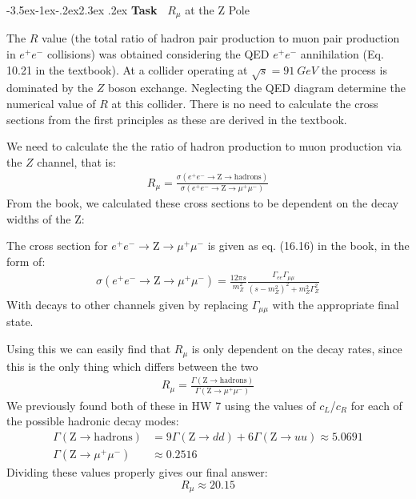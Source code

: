 \documentclass[12pt]{article}
\makeatletter
\newenvironment{thebook}
{\begin{mdframed}[style=defstyle,frametitle={From the Book}]}{\end{mdframed}}
\def\section{\@startsection{section}{1}{\z@ }%
  {-3.5ex\@plus -1ex\@minus -.2ex}{2.3ex \@plus .2ex}%
  {\noindent\normalfont \Large \bfseries Task\ }%
}
\numberwithin{equation}{section}
\makeatother
\begin{document}
\section{$R_\mu$ at the $\mathrm{Z}$ Pole}
\begin{problem}
  The $R$ value (the total ratio of hadron pair production to muon pair production in $e^+e^-$ collisions) was obtained considering the QED $e^+e^-$ annihilation (Eq. 10.21 in the textbook). At a collider operating at $\sqrt{s}=\SI{91}{GeV}$ the process is dominated by the $Z$ boson exchange. Neglecting the QED diagram determine the numerical value  of $R$ at this collider. There is no  need to calculate the cross sections from the first principles as these are derived in the textbook.
\end{problem}
We need to calculate the the ratio of hadron production to muon production via the $Z$ channel, that is:
\begin{align*}
  R_\mu=\frac{\sigma(e^+e^-\to\mathrm{Z}\to\text{hadrons})}
  {\sigma(e^+e^-\to\mathrm{Z}\to\mu^+\mu^-)}
\end{align*}
From the book, we calculated these cross sections to be dependent on the decay widths of the $\mathrm{Z}$:
\begin{thebook}
  The cross section for $e^+e^-\to\mathrm{Z}\to\mu^+\mu^-$ is given as eq. (16.16) in the book, in the form of:
  \begin{align*}
    \sigma(e^+e^-\to\mathrm{Z}\to\mu^+\mu^-)=
    \frac{12\pi s}{m_Z^2}\frac{\Gamma_{ee}\Gamma_{\mu\mu}}
    {{(s-m_Z^2)}^2+m_Z^2\Gamma_Z^2}
  \end{align*}
  With decays to other channels given by replacing $\Gamma_{\mu\mu}$ with the appropriate final state.
\end{thebook}
Using this we can easily find that $R_\mu$ is only dependent on the decay rates, since this is the only thing which differs between the two
\begin{align*}
  R_\mu=\frac{\Gamma(\mathrm{Z}\to\text{hadrons})}
  {\Gamma(\mathrm{Z}\to\mu^+\mu^-)}
\end{align*}
We previously found both of these in HW 7 using the values of $c_L$/$c_R$ for each of the possible hadronic decay modes:
\begin{align*}
  \Gamma(\mathrm{Z}\to\text{hadrons})&=
  9\Gamma(\mathrm{Z}\to dd)+6\Gamma(\mathrm{Z}\to uu)\approx5.0691\\
  \Gamma(\mathrm{Z}\to\mu^+\mu^-)&\approx0.2516
\end{align*}
Dividing these values properly gives our final answer:
\begin{equation}
  \label{eq:t41}
  \boxed{R_\mu\approx20.15}
\end{equation}
\newpage
\end{document}
